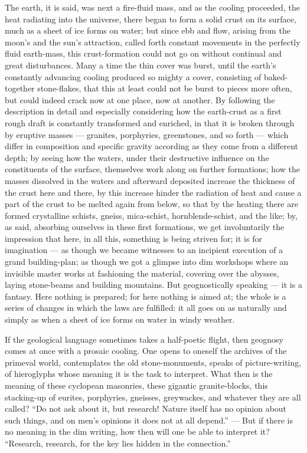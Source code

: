 \documentclass[12pt]{book}
\begin{document}
The earth, it is said, was next a fire-fluid mass, and as the cooling proceeded, the heat
radiating into the universe, there began to form a solid crust on its surface, much as a
sheet of ice forms on water; but since ebb and flow, arising from the moon's and the
sun's attraction, called forth constant movements in the perfectly fluid earth-mass, this
crust-formation could not go on without continual and great disturbances. Many a time the
thin cover was burst, until the earth's constantly advancing cooling produced so mighty a
cover, consisting of baked-together stone-flakes, that this at least could not be burst to
pieces more often, but could indeed crack now at one place, now at another. By following
the description in detail and especially considering how the earth-crust as a first rough
draft is constantly transformed and enriched, in that it is broken through by eruptive
masses --- granites, porphyries, greenstones, and so forth --- which differ in composition
and specific gravity according as they come from a different depth; by seeing how the
waters, under their destructive influence on the constituents of the surface, themselves
work along on further formations; how the masses dissolved in the waters and afterward
deposited increase the thickness of the crust here and there, by this increase hinder the
radiation of heat and cause a part of the crust to be melted again from below, so that by
the heating there are formed crystalline schists, gneiss, mica-schist, hornblende-schist,
and the like; by, as said, absorbing ourselves in these first formations, we get
involuntarily the impression that here, in all this, something is being striven for; it
is for imagination --- as though we became witnesses to an incipient execution of a grand
building-plan; as though we got a glimpse into dim workshops where an invisible master
works at fashioning the material, covering over the abysses, laying stone-beams and
building mountains. But geognostically speaking --- it is a fantasy. Here nothing is
prepared; for here nothing is aimed at; the whole is a series of changes in which the laws
are fulfilled: it all goes on as naturally and simply as when a sheet of ice forms on
water in windy weather.

If the geological language sometimes takes a half-poetic flight, then geognosy comes at
once with a prosaic cooling. One opens to oneself the archives of the primeval world,
contemplates the old stone-monuments, speaks of picture-writing, of hieroglyphs whose
meaning it is the task to interpret. What then is the meaning of these cyclopean
masonries, these gigantic granite-blocks, this stacking-up of eurites, porphyries,
gneisses, greywackes, and whatever they are all called? ``Do not ask about it, but
research! Nature itself has no opinion about such things, and on men's opinions it does
not at all depend.'' --- But if there is no meaning in the dim writing, how then will one
be able to interpret it? ``Research, research, for the key lies hidden in the
connection.''
\end{document}
